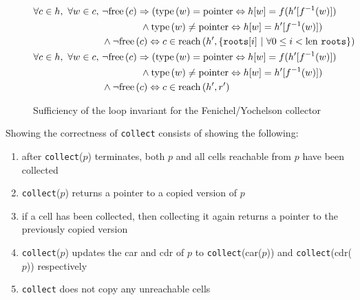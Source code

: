 \begin{figure}[t]
  \centering
  \begin{align*}
    \forall c \in h,\ \forall w \in c,\ &\lnot\free{c} \implies
    (\type{w} = \typointer \iff h[w] = f(h'[f^{-1}(w)])\\
    &\quad\quad\quad\quad \land \type{w} \neq \typointer
    \iff h[w] = h'[f^{-1}(w)])\\
    &\land \lnot\free{c} \iff c \in \reach{h'}{\{\mathtt{roots}[i]~|~\forall
      0 \leq i < \len\mathtt{roots}\}}\\
%
    \forall c \in h,\ \forall w \in c,\ &\lnot\free{c} \implies
    (\type{w} = \typointer \iff h[w] = f(h'[f^{-1}(w)])\\
    &\quad\quad\quad\quad \land \type{w} \neq \typointer
    \iff h[w] = h'[f^{-1}(w)])\\
    &\land \lnot\free{c} \iff c \in \reach{h'}{r'}
  \end{align*}
  \caption{Sufficiency of the loop invariant for the
    Fenichel/Yochelson collector}
  \label{fig:copying-example-partial-sufficient}
\end{figure}

\begin{theorem}
\label{lem:fyc}
  Showing the correctness of \texttt{collect} consists of showing the
  following:

  \begin{enumerate}
  \item after \texttt{collect}($p$) terminates, both $p$ and all cells
    reachable from $p$ have been collected

  \item \texttt{collect}($p$) returns a pointer to a copied version of
    $p$

  \item if a cell has been collected, then collecting it again returns
    a pointer to the previously copied version

  \item \texttt{collect}($p$) updates the car and cdr of $p$ to
    \texttt{collect}(car($p$)) and \texttt{collect}(cdr($p$))
    respectively

  \item \texttt{collect} does not copy any unreachable cells
  \end{enumerate}
\end{theorem}


